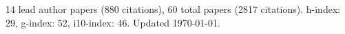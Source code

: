 14 lead author papers (880 citations),
60 total papers (2817 citations).\newline
h-index: 29, g-index: 52, i10-index: 46. Updated \today.